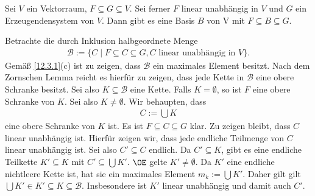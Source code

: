 \documentclass[../../main.tex]{subfiles}
\begin{document}
\begin{kor}\label{12.3.2}
Sei $V$ ein Vektorraum, $F\subseteq G\subseteq V$. Sei ferner $F$ linear unabhängig in $V$ und $G$ ein Erzeugendensystem von $V$. Dann gibt es eine Basis $B$ von V mit $F\subseteq B\subseteq G$.
\end{kor}
\begin{cproof}
Betrachte die durch Inklusion halbgeordnete Menge
\begin{align*}
\mathcal{B}:=\{C\mid F\subseteq C\subseteq G, C\text{ linear unabhängig in }V\}.
\end{align*}
Gemäß \ref{12.3.1}(c) ist zu zeigen, dass $\mathcal{B}$ ein maximales Element besitzt. Nach dem Zornschen Lemma reicht es hierfür zu zeigen, dass jede Kette in $\mathcal{B}$ eine obere Schranke besitzt. Sei also $K\subseteq \mathcal{B}$ eine Kette. Falls $K=\emptyset$, so ist $F$ eine obere Schranke von $K$. Sei also $K\neq \emptyset$. Wir behaupten, dass
\begin{align*}
C:=\bigcup K
\end{align*}
eine obere Schranke von $K$ ist. Es ist $F\subseteq C\subseteq G$ klar. Zu zeigen bleibt, dass $C$ linear unabhängig ist. Hierfür zeigen wir, dass jede endliche Teilmenge von $C$ linear unabhängig ist. Sei also $C'\subseteq C$ endlich. Da $C'\subseteq K$, gibt es eine endliche Teilkette $K'\subseteq K$ mit $C'\subseteq \bigcup K'$. $\OE$ gelte $K'\neq \emptyset$. Da $K'$ eine endliche nichtleere Kette ist, hat sie ein maximales Element $m_k:=\bigcup K'$. Daher gilt gilt $\bigcup K'\in K'\subseteq K\subseteq \mathcal{B}$. Insbesondere ist $K'$ linear unabhängig und damit auch $C'$.
\end{cproof}
\end{document}
